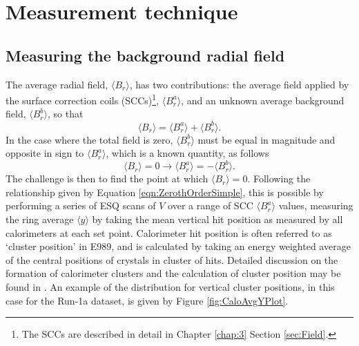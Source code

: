 \section{Measurement technique}\label{sec:MeasuringBr}

\subsection{Measuring the background radial field}\label{sec:MeasuringBr}


The average radial field, $\langle B_{r} \rangle$, has two contributions: the average field applied by the surface correction coils (SCCs)\footnote{The SCCs are described in detail in Chapter \ref{chap:3} Section \ref{sec:Field}.}, $\langle B_{r}^{a} \rangle$, and an unknown average background field, $\langle B_{r}^{b} \rangle$, so that 
%
\begin{equation} 
  \langle B_{r} \rangle = \langle B_{r}^{a}\rangle + \langle B_{r}^{b}\rangle.
  \label{eqn:TotalBr}
\end{equation}
%
In the case where the total field is zero, $\langle B_{r}^{b}\rangle$ must be equal in magnitude and opposite in sign to $\langle B_{r}^{a} \rangle$, which is a known quantity, as follows
%
\begin{equation} 
  \langle B_{r} \rangle = 0 \rightarrow \langle B_{r}^{a}\rangle = - \langle B_{r}^{b}\rangle.
\end{equation}
%
The challenge is then to find the point at which $\langle B_{r} \rangle = 0$. Following the relationship given by Equation \ref{eqn:ZerothOrderSimple}, this is possible by performing a series of ESQ scans of $V$ over a range of SCC $\langle B_{r}^{a} \rangle$ values, measuring the ring average $\langle y \rangle$ by taking the mean vertical hit position as measured by all calorimeters at each set point. Calorimeter hit position is often referred to as `cluster position' in E989, and is calculated by taking an energy weighted average of the central positions of crystals in cluster of hits. Detailed discussion on the formation of calorimeter clusters and the calculation of cluster position may be found in \cite{Fienberg}. An example of the distribution for vertical cluster positions, in this case for the Run-1a dataset, is given by Figure \ref{fig:CaloAvgYPlot}.

